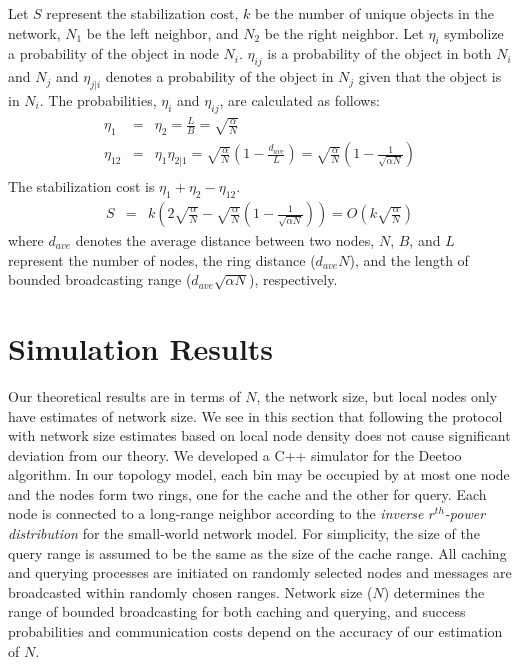 \documentclass[conference]{IEEEtran}
\begin{document}
Let $S$ represent the stabilization cost, $k$ be the number of unique objects in the network, 
$N_1$ be the left neighbor, 
and $N_2$ be the right neighbor. Let $\eta_i$ symbolize a probability of the object in node $N_i$. 
$\eta_{ij}$ is a probability of the object in both $N_i$ and $N_j$ and  
$\eta_{j|i}$ denotes a probability of the object in $N_j$ given that the object is in 
$N_i$. 
The probabilities, $\eta_i$ and $\eta_{ij}$, are calculated as follows:
\begin{eqnarray*}
\eta_1 &=& \eta_2 = \frac{L}{B} = \sqrt{\frac{\alpha}{N}} \\
\eta_{12} &=& \eta_1 \eta_{2|1} = \sqrt{\frac{\alpha}{N}}\left( 1-\frac{d_{ave}}{L} \right)
= \sqrt{\frac{\alpha}{N}}\left(1-\frac{1}{\sqrt{\alpha N}}\right) \\
\end{eqnarray*}
The stabilization cost is $\eta_1+\eta_2-\eta_{12}$.
\begin{eqnarray*}
S &=& k\left(2\sqrt{\frac{\alpha}{N}}-\sqrt{\frac{\alpha}{N}}\left(1-\frac{1}{\sqrt{\alpha N}}\right) \right) 
    = O\left(k\sqrt{\frac{\alpha}{N}}\right)
\end{eqnarray*}
where $d_{ave}$ denotes the average distance between two nodes, 
$N$, $B$, and $L$ represent the number 
of nodes, the ring distance ($d_{ave}N$), 
and the length of bounded broadcasting range ($d_{ave}\sqrt{\alpha N}$), respectively.

\section{Simulation Results}\label{sec:simulation}
Our theoretical results are in terms of $N$, the network size, 
but local nodes only have estimates of network
size.  We see in this section that following the protocol with network
size estimates based on local node density\cite{LuoQHC08}
does not cause significant deviation from our theory.
We developed a C++ simulator for the Deetoo algorithm.
In our topology model, 
each bin may be occupied by at most one node and the nodes form two rings,
one for the cache and the other for query.
%
Each node is connected to a long-range neighbor according
to the \emph{inverse $r^{th}$-power distribution} for the small-world network model. 
For simplicity, the size of the query range is assumed to be the same as the size of the cache 
range. All caching and querying processes are initiated on randomly selected nodes and
messages are broadcasted within randomly chosen ranges.
Network size ($N$) determines the range of bounded broadcasting for both caching and querying, and
success probabilities and communication costs depend on the accuracy of our estimation of $N$.
\end{document}
